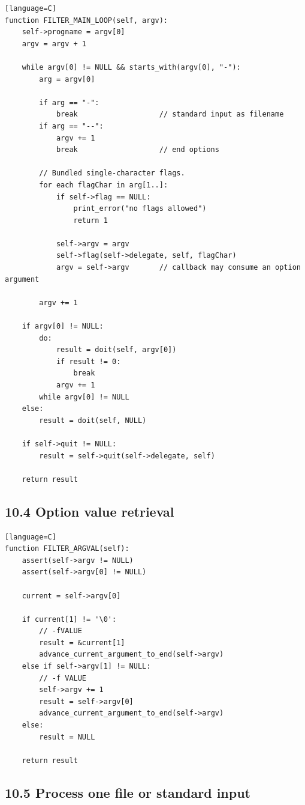 \documentclass[11pt]{article}
\begin{document}
\begin{verbatim}[language=C]
function FILTER_MAIN_LOOP(self, argv):
    self->progname = argv[0]
    argv = argv + 1

    while argv[0] != NULL && starts_with(argv[0], "-"):
        arg = argv[0]

        if arg == "-":
            break                   // standard input as filename
        if arg == "--":
            argv += 1
            break                   // end options

        // Bundled single-character flags.
        for each flagChar in arg[1..]:
            if self->flag == NULL:
                print_error("no flags allowed")
                return 1

            self->argv = argv
            self->flag(self->delegate, self, flagChar)
            argv = self->argv       // callback may consume an option argument

        argv += 1

    if argv[0] != NULL:
        do:
            result = doit(self, argv[0])
            if result != 0:
                break
            argv += 1
        while argv[0] != NULL
    else:
        result = doit(self, NULL)

    if self->quit != NULL:
        result = self->quit(self->delegate, self)

    return result
\end{verbatim}

\subsection{10.4 Option value retrieval}\label{option-value-retrieval}

\begin{verbatim}[language=C]
function FILTER_ARGVAL(self):
    assert(self->argv != NULL)
    assert(self->argv[0] != NULL)

    current = self->argv[0]

    if current[1] != '\0':
        // -fVALUE
        result = &current[1]
        advance_current_argument_to_end(self->argv)
    else if self->argv[1] != NULL:
        // -f VALUE
        self->argv += 1
        result = self->argv[0]
        advance_current_argument_to_end(self->argv)
    else:
        result = NULL

    return result
\end{verbatim}

\subsection{10.5 Process one file or standard
input}\label{process-one-file-or-standard-input}
\end{document}
